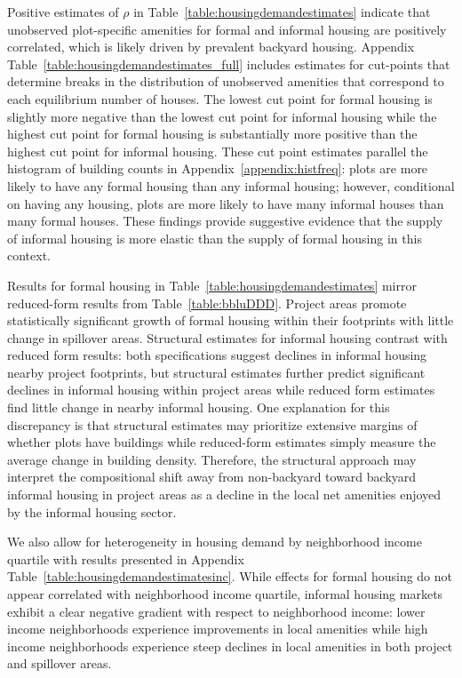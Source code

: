 \documentclass[12pt]{article}
\begin{document}
Positive estimates of $\rho$ in Table~\ref{table:housingdemandestimates} indicate that unobserved plot-specific amenities for formal and informal housing are positively correlated, which is likely driven by prevalent backyard housing.  Appendix Table~\ref{table:housingdemandestimates_full} includes estimates for cut-points that determine breaks in the distribution of unobserved amenities that correspond to each equilibrium number of houses.  The lowest cut point for formal housing is slightly more negative than the lowest cut point for informal housing while the highest cut point for formal housing is substantially more positive than the highest cut point for informal housing.  These cut point estimates parallel the histogram of building counts in Appendix~\ref{appendix:histfreq}:  plots are more likely to have any formal housing than any informal housing; however, conditional on having any housing, plots are more likely to have many informal houses than many formal houses.  These findings provide suggestive evidence that the supply of informal housing is more elastic than the supply of formal housing in this context.

Results for formal housing in Table~\ref{table:housingdemandestimates} mirror reduced-form results from Table~\ref{table:bbluDDD}.  Project areas promote statistically significant growth of formal housing within their footprints with little change in spillover areas.  Structural estimates for informal housing contrast with reduced form results: both specifications suggest declines in informal housing nearby project footprints, but structural estimates further predict significant declines in informal housing within project areas while reduced form estimates find little change in nearby informal housing.  One explanation for this discrepancy is that structural estimates may prioritize extensive margins of whether plots have buildings while reduced-form estimates simply measure the average change in building density.  Therefore, the structural approach may interpret the compositional shift away from non-backyard toward backyard informal housing in project areas as a decline in the local net amenities enjoyed by the informal housing sector.

We also allow for heterogeneity in housing demand by neighborhood income quartile with results presented in Appendix Table~\ref{table:housingdemandestimatesinc}.  While effects for formal housing do not appear correlated with neighborhood income quartile, informal housing markets exhibit a clear negative gradient with respect to neighborhood income: lower income neighborhoods experience improvements in local amenities while high income neighborhoods experience steep declines in local amenities in both project and spillover areas.
\end{document}
